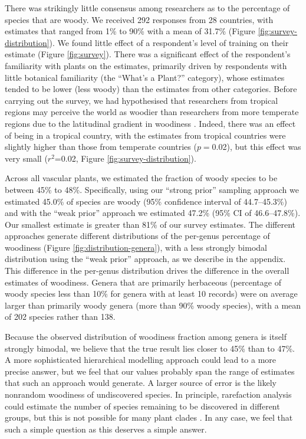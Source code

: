 \documentclass[a4paper,12pt]{article}
\begin{document}
There was strikingly little consensus among researchers as to the
percentage of species that are woody.  We received 292 responses from
28 countries, with estimates that ranged from 1\% to 90\% with a mean
of 31.7\% (Figure \ref{fig:survey-distribution}).
We found little effect of a respondent's level of training on their
estimate (Figure \ref{fig:survey}).  There was a significant effect of
the respondent's familiarity with plants on the estimates, primarily
driven by respondents with little botanical familiarity (the ``What's
a Plant?'' category), whose estimates tended to be lower (less woody)
than the estimates from other categories.
%
Before carrying out the survey, we had hypothesised that researchers
from tropical regions may perceive the world as woodier than
researchers from more temperate regions due to the latitudinal
gradient in woodiness \citep{Molesheihgt}.
%
Indeed, there was an effect of being in a tropical country, with the
estimates from tropical countries were slightly higher than those from
temperate countries ($p=$0.02), but this effect was very small
($r^2$=0.02, Figure \ref{fig:survey-distribution}).

Across all vascular plants, we estimated the fraction of woody species
to be between 45\% to 48\%.
Specifically, using our ``strong prior'' sampling approach we
estimated 45.0\% of species are woody (95\% confidence interval of
44.7--45.3\%) and with the ``weak prior'' approach we estimated 47.2\%
(95\% CI of 46.6--47.8\%).  Our smallest estimate is greater than 81\%
of our survey estimates.
The different approaches generate different distributions of the
per-genus percentage of woodiness (Figure
\ref{fig:distribution-genera}), with a less strongly bimodal
distribution using the ``weak prior'' approach, as we describe in the
appendix.
%
This difference in the per-genus distribution drives the difference in
the overall estimates of woodiness.  Genera that are primarily
herbaceous (percentage of woody species less than 10\% for genera with
at least 10 records) were on average larger than primarily woody
genera (more than 90\% woody species), with a mean of 202 species
rather than 138.

Because the observed distribution of woodiness fraction among genera
is itself strongly bimodal, we believe that the true result lies
closer to 45\% than to 47\%.  A more sophisticated hierarchical
modelling approach could lead to a more precise answer, but we feel
that our values probably span the range of estimates that such an
approach would generate.
%
A larger source of error is the likely nonrandom woodiness of
undiscovered species.  In principle, rarefaction analysis could
estimate the number of species remaining to be discovered in different
groups, but this is not possible for many plant clades
\citep{costello2011}.
%
In any case, we feel that such a simple question as this deserves a
simple answer.
\end{document}
